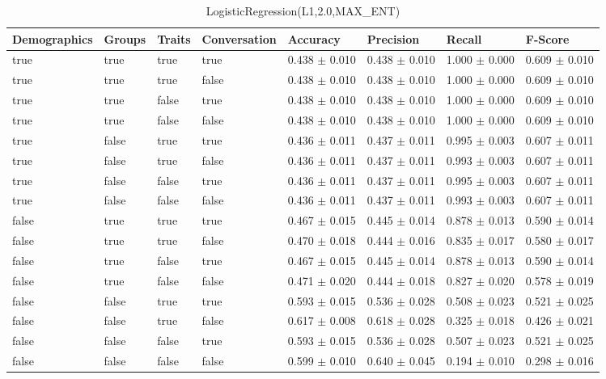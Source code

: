 \clearpage
\begin{table}[h]
	\centering
	\begin{tabular}{|l|l|l|l|l|l|l|l|} %
	\hline
	Demographics & Groups & Traits & Conversation & Accuracy & Precision & Recall & F-Score \\ \hline
	true & true & true & true & 0.438	\( \pm \) 0.010	& 0.438	\( \pm \) 0.010	& 1.000	\( \pm \) 0.000	& 0.609	\( \pm \) 0.010	\\ \hline
	true & true & true & false & 0.438	\( \pm \) 0.010	& 0.438	\( \pm \) 0.010	& 1.000	\( \pm \) 0.000	& 0.609	\( \pm \) 0.010	\\ \hline
	true & true & false & true & 0.438	\( \pm \) 0.010	& 0.438	\( \pm \) 0.010	& 1.000	\( \pm \) 0.000	& 0.609	\( \pm \) 0.010	\\ \hline
	true & true & false & false & 0.438	\( \pm \) 0.010	& 0.438	\( \pm \) 0.010	& 1.000	\( \pm \) 0.000	& 0.609	\( \pm \) 0.010	\\ \hline
	true & false & true & true & 0.436	\( \pm \) 0.011	& 0.437	\( \pm \) 0.011	& 0.995	\( \pm \) 0.003	& 0.607	\( \pm \) 0.011	\\ \hline
	true & false & true & false & 0.436	\( \pm \) 0.011	& 0.437	\( \pm \) 0.011	& 0.993	\( \pm \) 0.003	& 0.607	\( \pm \) 0.011	\\ \hline
	true & false & false & true & 0.436	\( \pm \) 0.011	& 0.437	\( \pm \) 0.011	& 0.995	\( \pm \) 0.003	& 0.607	\( \pm \) 0.011	\\ \hline
	true & false & false & false & 0.436	\( \pm \) 0.011	& 0.437	\( \pm \) 0.011	& 0.993	\( \pm \) 0.003	& 0.607	\( \pm \) 0.011	\\ \hline
	false & true & true & true & 0.467	\( \pm \) 0.015	& 0.445	\( \pm \) 0.014	& 0.878	\( \pm \) 0.013	& 0.590	\( \pm \) 0.014	\\ \hline
	false & true & true & false & 0.470	\( \pm \) 0.018	& 0.444	\( \pm \) 0.016	& 0.835	\( \pm \) 0.017	& 0.580	\( \pm \) 0.017	\\ \hline
	false & true & false & true & 0.467	\( \pm \) 0.015	& 0.445	\( \pm \) 0.014	& 0.878	\( \pm \) 0.013	& 0.590	\( \pm \) 0.014	\\ \hline
	false & true & false & false & 0.471	\( \pm \) 0.020	& 0.444	\( \pm \) 0.018	& 0.827	\( \pm \) 0.020	& 0.578	\( \pm \) 0.019	\\ \hline
	false & false & true & true & 0.593	\( \pm \) 0.015	& 0.536	\( \pm \) 0.028	& 0.508	\( \pm \) 0.023	& 0.521	\( \pm \) 0.025	\\ \hline
	false & false & true & false & 0.617	\( \pm \) 0.008	& 0.618	\( \pm \) 0.028	& 0.325	\( \pm \) 0.018	& 0.426	\( \pm \) 0.021	\\ \hline
	false & false & false & true & 0.593	\( \pm \) 0.015	& 0.536	\( \pm \) 0.028	& 0.507	\( \pm \) 0.023	& 0.521	\( \pm \) 0.025	\\ \hline
	false & false & false & false & 0.599	\( \pm \) 0.010	& 0.640	\( \pm \) 0.045	& 0.194	\( \pm \) 0.010	& 0.298	\( \pm \) 0.016	\\ \hline
	\end{tabular}
	\caption{LogisticRegression(L1,2.0,MAX\_ENT)}
	\label{tab:revpol}
\end{table}
